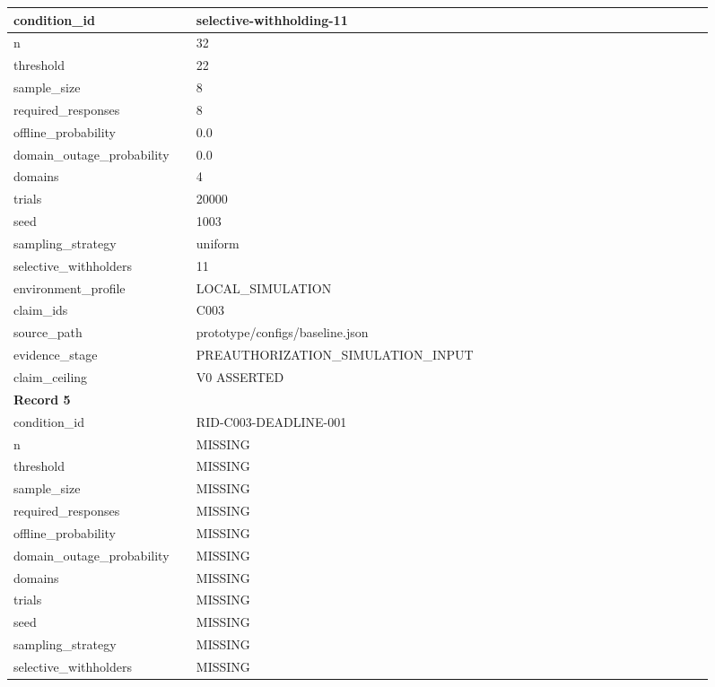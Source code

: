 \begin{longtable}{|p{0.24\linewidth}|p{0.68\linewidth}|}
condition\_\allowbreak{}id & selective-withholding-11 \\ \hline
n & 32 \\ \hline
threshold & 22 \\ \hline
sample\_\allowbreak{}size & 8 \\ \hline
required\_\allowbreak{}responses & 8 \\ \hline
offline\_\allowbreak{}probability & 0.0 \\ \hline
domain\_\allowbreak{}outage\_\allowbreak{}probability & 0.0 \\ \hline
domains & 4 \\ \hline
trials & 20000 \\ \hline
seed & 1003 \\ \hline
sampling\_\allowbreak{}strategy & uniform \\ \hline
selective\_\allowbreak{}withholders & 11 \\ \hline
environment\_\allowbreak{}profile & LOCAL\_\allowbreak{}SIMULATION \\ \hline
claim\_\allowbreak{}ids & C003 \\ \hline
source\_\allowbreak{}path & prototype/configs/baseline.json \\ \hline
evidence\_\allowbreak{}stage & PREAUTHORIZATION\_\allowbreak{}SIMULATION\_\allowbreak{}INPUT \\ \hline
claim\_\allowbreak{}ceiling & V0 ASSERTED \\ \hline
\multicolumn{2}{|l|}{\textbf{Record 5}} \\ \hline
condition\_\allowbreak{}id & RID-C003-DEADLINE-001 \\ \hline
n & MISSING \\ \hline
threshold & MISSING \\ \hline
sample\_\allowbreak{}size & MISSING \\ \hline
required\_\allowbreak{}responses & MISSING \\ \hline
offline\_\allowbreak{}probability & MISSING \\ \hline
domain\_\allowbreak{}outage\_\allowbreak{}probability & MISSING \\ \hline
domains & MISSING \\ \hline
trials & MISSING \\ \hline
seed & MISSING \\ \hline
sampling\_\allowbreak{}strategy & MISSING \\ \hline
selective\_\allowbreak{}withholders & MISSING \\ \hline

\end{longtable}
